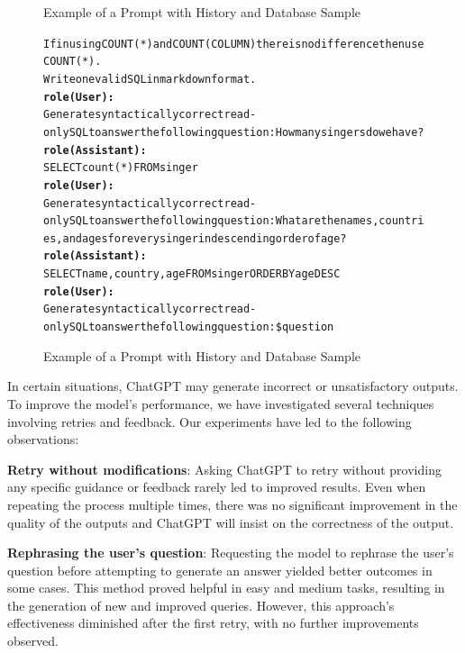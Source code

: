 \begin{figure}[H]
\begin{AIbox}{Example of a Prompt with History and Database Sample}
{\begin{alltt}
                If in using  COUNT(*) and COUNT(COLUMN) there is no difference then use COUNT(*). \\
                Write one valid SQL in markdown format.
                \\
                {\bf role(User):} \\
                Generate syntactically correct read-only SQL to answer the following question: How many singers do we have?
                \\
                {\bf role(Assistant):} \\
                SELECT count(*) FROM singer
                \\
                {\bf role(User):} \\
                Generate syntactically correct read-only SQL to answer the following question: What are the names, countries, and ages for every singer in descending order of age?
                \\
                {\bf role(Assistant):} \\
                SELECT name,  country,  age FROM singer ORDER BY age DESC
                \\
                {\bf role(User):} \\
                Generate syntactically correct read-only SQL to answer the following question: \$question
            \end{alltt}
        }
        \vspace{-5px}
    \end{AIbox}
    \caption{Example of a Prompt with History and Database Sample}
\end{figure}


In certain situations, ChatGPT may generate incorrect or unsatisfactory outputs. To improve the model's performance, we have investigated several techniques involving retries and feedback. Our experiments have led to the following observations:

\textbf{Retry without modifications}: Asking ChatGPT to retry without providing any specific guidance or feedback rarely led to improved results. Even when repeating the process multiple times, there was no significant improvement in the quality of the outputs and ChatGPT will insist on the correctness of the output.

\textbf{Rephrasing the user's question}: Requesting the model to rephrase the user's question before attempting to generate an answer yielded better outcomes in some cases. This method proved helpful in easy and medium tasks, resulting in the generation of new and improved queries. However, this approach's effectiveness diminished after the first retry, with no further improvements observed.

